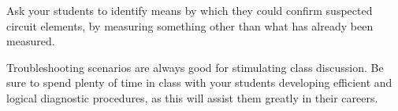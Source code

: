 





Ask your students to identify means by which they could confirm suspected circuit elements, by measuring something other than what has already been measured.

Troubleshooting scenarios are always good for stimulating class discussion.  Be sure to spend plenty of time in class with your students developing efficient and logical diagnostic procedures, as this will assist them greatly in their careers.




